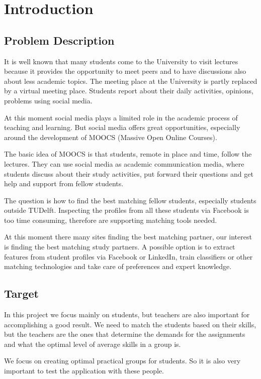 \chapter{Introduction}

\section{Problem Description}
It is well known that many students come to the University to visit lectures because it provides the opportunity to meet peers and to have discussions also about less academic topics. 
The meeting place at the University is partly replaced by a virtual meeting place. 
Students report about their daily activities, opinions, problems using social media. 

At this moment social media plays a limited role in the academic process of teaching and learning. 
But social media offers great opportunities, especially around the development of MOOCS (Massive Open Online Courses). 

The basic idea of MOOCS is that students, remote in place and time, follow the lectures. 
They can use social media as academic communication media, where students discuss about their study activities, put forward their questions and get help and support from fellow students. 

The question is how to find the best matching fellow students, especially students outside TUDelft. 
Inspecting the profiles from all these students via Facebook is too time consuming, therefore are supporting matching tools needed. 

At this moment there many sites finding the best matching partner, our interest is finding the best matching study partners. 
A possible option is to extract features from student profiles via Facebook or LinkedIn, train classifiers or other matching technologies and take care of preferences and expert knowledge.

\section{Target}
In this project we focus mainly on students, but teachers are also important for accomplishing a good result.
We need to match the students based on their skills, but the teachers are the ones that determine the demands for the assignments and what the optimal level of average skills in a group is.

We focus on creating optimal practical groups for students.
So it is also very important to test the application with these people.

